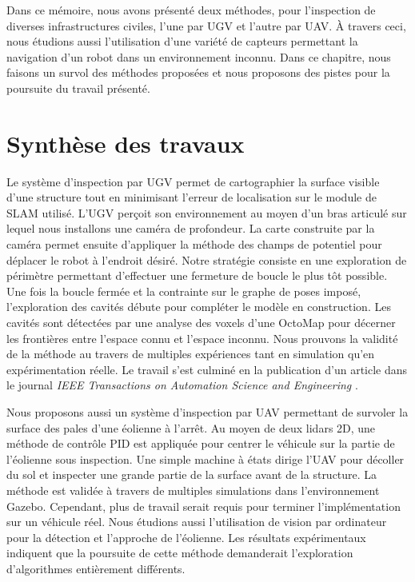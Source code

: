 \label{sec:Conclusion}

Dans ce mémoire, nous avons présenté deux méthodes, pour l'inspection de diverses infrastructures civiles, l'une par UGV et l'autre par UAV. À travers ceci, nous étudions aussi l'utilisation d'une variété de capteurs permettant la navigation d'un robot dans un environnement inconnu. Dans ce chapitre, nous faisons un survol des méthodes proposées et nous proposons des pistes pour la poursuite du travail présenté.

\section{Synthèse des travaux}

Le système d'inspection par UGV permet de cartographier la surface visible d'une structure tout en minimisant l'erreur de localisation sur le module de SLAM utilisé. L'UGV perçoit son environnement au moyen d'un bras articulé sur lequel nous installons une caméra de profondeur. La carte construite par la caméra permet ensuite d'appliquer la méthode des champs de potentiel pour déplacer le robot à l'endroit désiré. Notre stratégie consiste en une exploration de périmètre permettant d'effectuer une fermeture de boucle le plus tôt possible. Une fois la boucle fermée et la contrainte sur le graphe de poses imposé, l'exploration des cavités débute pour compléter le modèle en construction. Les cavités sont détectées par une analyse des voxels d'une OctoMap pour décerner les frontières entre l'espace connu et l'espace inconnu. Nous prouvons la validité de la méthode au travers de multiples expériences tant en simulation qu'en expérimentation réelle. Le travail s'est culminé en la publication d'un article dans le journal \emph{IEEE Transactions on Automation Science and Engineering} \citep{Ramanagopal2017}.

Nous proposons aussi un système d'inspection par UAV permettant de survoler la surface des pales d'une éolienne à l'arrêt. Au moyen de deux lidars 2D, une méthode de contrôle PID est appliquée pour centrer le véhicule sur la partie de l'éolienne sous inspection. Une simple machine à états dirige l'UAV pour décoller du sol et inspecter une grande partie de la surface avant de la structure. La méthode est validée à travers de multiples simulations dans l'environnement Gazebo. Cependant, plus de travail serait requis pour terminer l'implémentation sur un véhicule réel. Nous étudions aussi l'utilisation de vision par ordinateur pour la détection et l'approche de l'éolienne. Les résultats expérimentaux indiquent que la poursuite de cette méthode demanderait l'exploration d'algorithmes entièrement différents.


